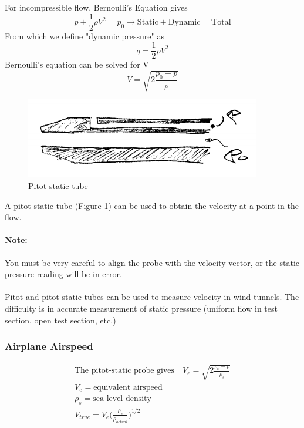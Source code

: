 \documentclass[draft=false, titlepage]{article}
\begin{document}
For incompressible flow, Bernoulli's Equation gives
\begin{equation*}
p + \frac{1}{2}\rho V^2 = p_0 \rightarrow \text{Static} + \text{Dynamic} = \text{Total}
\end{equation*}
From which we define "dynamic pressure" as
\begin{equation}
q = \frac{1}{2}\rho V^2
\label{eq:dynamicPressure}
\end{equation}
Bernoulli's equation can be solved for V
\begin{equation}
\boxed{V = \sqrt{2\frac{p_0-p}{\rho}}}
\label{eq:vFromBernoulli}
\end{equation}
\begin{figure}[ht]
	\centering
	\includegraphics[width=0.4\linewidth]{Figures/p12_pitotStatic.PNG}
	\caption{Pitot-static tube}
	\label{fig:p12_pitotStatic}
\end{figure}
A pitot-static tube (Figure \ref{fig:p12_pitotStatic}) can be used to obtain the velocity at a point in the flow.
\paragraph*{Note:} You must be very careful to align the probe with the velocity vector, or the static pressure reading will be in error.
\paragraph*{} Pitot and pitot static tubes can be used to measure velocity in wind tunnels. The difficulty is in accurate measurement of static pressure (uniform flow in test section, open test section, etc.)

\subsubsection{Airplane Airspeed}
\begin{gather*}
\text{The pitot-static probe gives} \quad V_e = \sqrt{2\frac{p_0-p}{\rho_s}}\\
V_e = \text{equivalent airspeed}\\
\rho_s = \text{sea level density}\\
V_{true} = V_e \Big( \frac{\rho_s}{\rho_{actual}} \Big)^{1/2}
\end{gather*}
\end{document}
